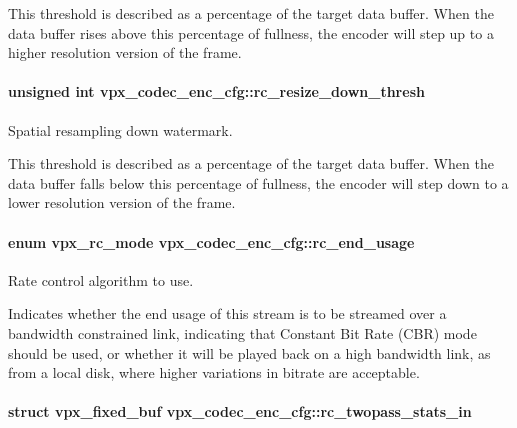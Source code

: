 \-This threshold is described as a percentage of the target data buffer. \-When the data buffer rises above this percentage of fullness, the encoder will step up to a higher resolution version of the frame. \hypertarget{structvpx__codec__enc__cfg_a1be7bd7b0eaf1e99b5e4028c37c65488}{
\paragraph[{rc\-\_\-resize\-\_\-down\-\_\-thresh}]{\setlength{\rightskip}{0pt plus 5cm}unsigned int {\bf vpx\-\_\-codec\-\_\-enc\-\_\-cfg\-::rc\-\_\-resize\-\_\-down\-\_\-thresh}}}\label{structvpx__codec__enc__cfg_a1be7bd7b0eaf1e99b5e4028c37c65488}


\-Spatial resampling down watermark. 

\-This threshold is described as a percentage of the target data buffer. \-When the data buffer falls below this percentage of fullness, the encoder will step down to a lower resolution version of the frame. \hypertarget{structvpx__codec__enc__cfg_a99c415edb6c6f909a095a57c3430a116}{
\paragraph[{rc\-\_\-end\-\_\-usage}]{\setlength{\rightskip}{0pt plus 5cm}enum {\bf vpx\-\_\-rc\-\_\-mode} {\bf vpx\-\_\-codec\-\_\-enc\-\_\-cfg\-::rc\-\_\-end\-\_\-usage}}}\label{structvpx__codec__enc__cfg_a99c415edb6c6f909a095a57c3430a116}


\-Rate control algorithm to use. 

\-Indicates whether the end usage of this stream is to be streamed over a bandwidth constrained link, indicating that \-Constant \-Bit \-Rate (\-C\-B\-R) mode should be used, or whether it will be played back on a high bandwidth link, as from a local disk, where higher variations in bitrate are acceptable. \hypertarget{structvpx__codec__enc__cfg_a618616a07d9d8883c544731957b56f3c}{
\paragraph[{rc\-\_\-twopass\-\_\-stats\-\_\-in}]{\setlength{\rightskip}{0pt plus 5cm}struct {\bf vpx\-\_\-fixed\-\_\-buf} {\bf vpx\-\_\-codec\-\_\-enc\-\_\-cfg\-::rc\-\_\-twopass\-\_\-stats\-\_\-in}}}\label{structvpx__codec__enc__cfg_a618616a07d9d8883c544731957b56f3c}


